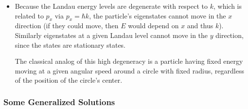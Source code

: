 \documentclass[11pt, a4paper]{article}
\begin{document}
\begin{itemize}
	\item Because the Landau energy levels are degenerate with respect to $ k $, which is related to $ p_{x} $ via $ p_{x} = \hbar k $, the particle's eigenstates cannot move in the $ x $ direction (if they could move, then $ E $ would depend on $ x $ and thus $ k $). Similarly eigenstates at a given Landau level cannot move in the $ y $ direction, since the states are stationary states. 
	
	The classical analog of this high degeneracy is a particle having fixed energy moving at a given angular speed around a circle with fixed radius, regardless of the position of the circle's center.
	
\end{itemize}

\subsubsection{Some Generalized Solutions}
\end{document}
